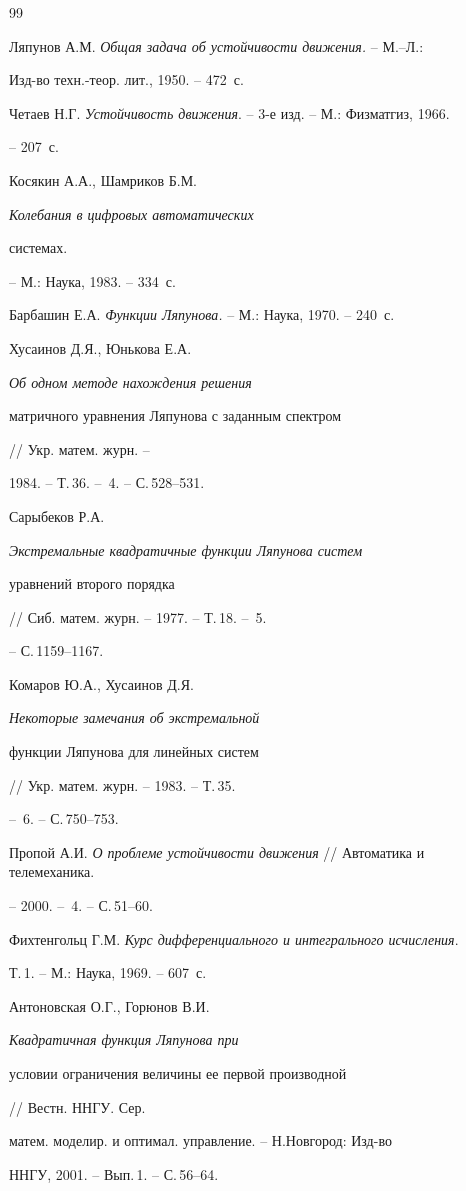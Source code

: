 \begin{thebibliography}{99}







Ляпунов А.М. {\it Общая задача об устойчивости движения.} -- М.--Л.:


Изд-во техн.-теор. лит., 1950. -- 472~с.




Четаев Н.Г. {\it Устойчивость движения}. -- 3-е изд. -- М.: Физматгиз, 1966.


-- 207~с.




Косякин А.А., Шамриков Б.М. {\it Колебания в цифровых автоматических


системах.} -- М.: Наука, 1983. -- 334~с.




Барбашин Е.А. {\it Функции Ляпунова.} -- М.: Наука, 1970. -- 240~с.




Хусаинов Д.Я., Юнькова Е.А. {\it Об одном методе нахождения решения


матричного уравнения Ляпунова с заданным спектром } // Укр. матем. журн. --


1984. -- Т.\,36. -- \No\,4. -- С.\,528--531.




Сарыбеков Р.А. {\it Экстремальные квадратичные функции Ляпунова систем


уравнений второго порядка} // Сиб. матем. журн. -- 1977. -- Т.\,18. -- \No\,5.


-- С.\,1159--1167.




Комаров Ю.А., Хусаинов Д.Я. {\it Некоторые замечания об экстремальной


функции Ляпунова для линейных систем} // Укр. матем. журн. -- 1983. -- Т.\,35.


-- \No\,6. -- С.\,750--753.




Пропой А.И. {\it О проблеме устойчивости движения} // Автоматика и телемеханика.


-- 2000. -- \No\,4. -- С.\,51--60.




Фихтенгольц Г.М. {\it Курс дифференциального и интегрального исчисления}.


Т.\,1. -- М.: Наука, 1969. -- 607~с.




Антоновская О.Г., Горюнов В.И. {\it Квадратичная функция Ляпунова при


условии ограничения величины ее первой производной} // Вестн. ННГУ. Сер.


матем. моделир. и оптимал. управление. -- Н.\;Новгород: Изд-во


ННГУ, 2001. -- Вып.\,1. -- С.\,56--64.





\end{thebibliography}





